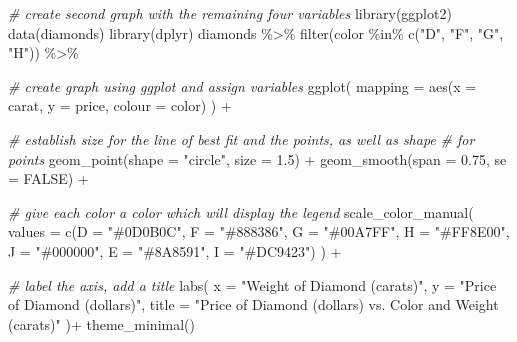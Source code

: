 \documentclass[
]{article}
\newenvironment{Shaded}{\begin{snugshade}}{\end{snugshade}}
\newcommand{\AttributeTok}[1]{\textcolor[rgb]{0.77,0.63,0.00}{#1}}
\newcommand{\CommentTok}[1]{\textcolor[rgb]{0.56,0.35,0.01}{\textit{#1}}}
\newcommand{\ConstantTok}[1]{\textcolor[rgb]{0.00,0.00,0.00}{#1}}
\newcommand{\FloatTok}[1]{\textcolor[rgb]{0.00,0.00,0.81}{#1}}
\newcommand{\FunctionTok}[1]{\textcolor[rgb]{0.00,0.00,0.00}{#1}}
\newcommand{\NormalTok}[1]{#1}
\newcommand{\SpecialCharTok}[1]{\textcolor[rgb]{0.00,0.00,0.00}{#1}}
\newcommand{\StringTok}[1]{\textcolor[rgb]{0.31,0.60,0.02}{#1}}
\begin{document}
\begin{Shaded}
\begin{Highlighting}[]
\CommentTok{\# create second graph with the remaining four variables}
\FunctionTok{library}\NormalTok{(ggplot2)}
\FunctionTok{data}\NormalTok{(diamonds)}
\FunctionTok{library}\NormalTok{(dplyr)}
\NormalTok{diamonds }\SpecialCharTok{\%\textgreater{}\%}
\FunctionTok{filter}\NormalTok{(color }\SpecialCharTok{\%in\%} \FunctionTok{c}\NormalTok{(}\StringTok{"D"}\NormalTok{, }\StringTok{"F"}\NormalTok{, }\StringTok{"G"}\NormalTok{, }\StringTok{"H"}\NormalTok{)) }\SpecialCharTok{\%\textgreater{}\%}

\CommentTok{\# create graph using ggplot and assign variables}
\FunctionTok{ggplot}\NormalTok{(}
\AttributeTok{mapping =} \FunctionTok{aes}\NormalTok{(}\AttributeTok{x =}\NormalTok{ carat, }\AttributeTok{y =}\NormalTok{ price, }\AttributeTok{colour =}\NormalTok{ color)}
\NormalTok{) }\SpecialCharTok{+}

\CommentTok{\# establish size for the line of best fit and the points, as well as shape}
\CommentTok{\# for points}
\FunctionTok{geom\_point}\NormalTok{(}\AttributeTok{shape =} \StringTok{"circle"}\NormalTok{, }\AttributeTok{size =} \FloatTok{1.5}\NormalTok{) }\SpecialCharTok{+}
\FunctionTok{geom\_smooth}\NormalTok{(}\AttributeTok{span =} \FloatTok{0.75}\NormalTok{, }\AttributeTok{se =} \ConstantTok{FALSE}\NormalTok{) }\SpecialCharTok{+}

\CommentTok{\# give each color a color which will display the legend}
\FunctionTok{scale\_color\_manual}\NormalTok{(}
\AttributeTok{values =} \FunctionTok{c}\NormalTok{(}\AttributeTok{D =} \StringTok{"\#0D0B0C"}\NormalTok{,}
\AttributeTok{F =} \StringTok{"\#888386"}\NormalTok{,}
\AttributeTok{G =} \StringTok{"\#00A7FF"}\NormalTok{,}
\AttributeTok{H =} \StringTok{"\#FF8E00"}\NormalTok{,}
\AttributeTok{J =} \StringTok{"\#000000"}\NormalTok{,}
\AttributeTok{E =} \StringTok{"\#8A8591"}\NormalTok{,}
\AttributeTok{I =} \StringTok{"\#DC9423"}\NormalTok{)}
\NormalTok{) }\SpecialCharTok{+}

\CommentTok{\# label the axis, add a title}
\FunctionTok{labs}\NormalTok{(}
\AttributeTok{x =} \StringTok{"Weight of Diamond (carats)"}\NormalTok{,}
\AttributeTok{y =} \StringTok{"Price of Diamond (dollars)"}\NormalTok{,}
\AttributeTok{title =} \StringTok{"Price of Diamond (dollars) vs. Color and Weight (carats)"}
\NormalTok{)}\SpecialCharTok{+}
\FunctionTok{theme\_minimal}\NormalTok{()}
\end{Highlighting}
\end{Shaded}
\end{document}

